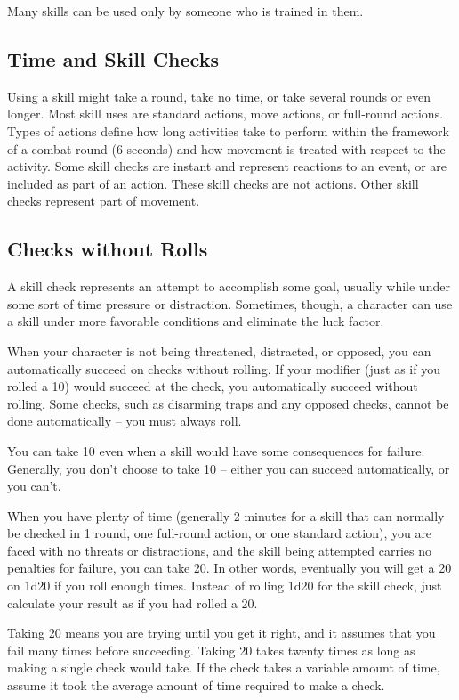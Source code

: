 Many skills can be used only by someone who is trained in them.

\subsection{Time and Skill Checks}
Using a skill might take a round, take no time, or take several rounds or even longer. Most skill uses are standard actions, move actions, or full-round actions. Types of actions define how long activities take to perform within the framework of a combat round (6 seconds) and how movement is treated with respect to the activity. Some skill checks are instant and represent reactions to an event, or are included as part of an action. These skill checks are not actions. Other skill checks represent part of movement.

\subsection{Checks without Rolls}
A skill check represents an attempt to accomplish some goal, usually while under some sort of time pressure or distraction. Sometimes, though, a character can use a skill under more favorable conditions and eliminate the luck factor.

\label{Taking 10} When your character is not being threatened, distracted, or opposed, you can automatically succeed on checks without rolling. If your modifier  (just as if you rolled a 10) would succeed at the check, you automatically succeed without rolling. Some checks, such as disarming traps and any opposed checks, cannot be done automatically -- you must always roll.

You can take 10 even when a skill would have some consequences for failure. Generally, you don't choose to take 10 -- either you can succeed automatically, or you can't.

 When you have plenty of time (generally 2 minutes for a skill that can normally be checked in 1 round, one full-round action, or one standard action), you are faced with no threats or distractions, and the skill being attempted carries no penalties for failure, you can take 20. In other words, eventually you will get a 20 on 1d20 if you roll enough times. Instead of rolling 1d20 for the skill check, just calculate your result as if you had rolled a 20.

Taking 20 means you are trying until you get it right, and it assumes that you fail many times before succeeding. Taking 20 takes twenty times as long as making a single check would take. If the check takes a variable amount of time, assume it took the average amount of time required to make a check.

